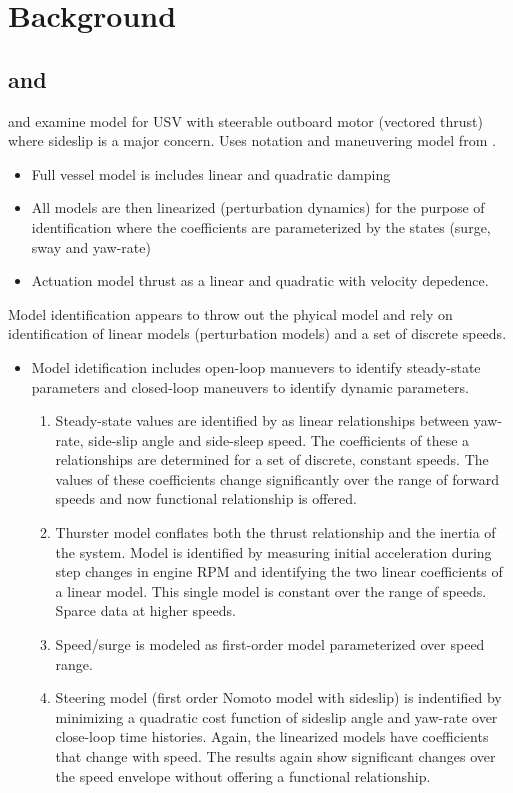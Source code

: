 \documentclass[11pt,draftcls,journal,onecolumn]{../latexlib/latex_ieee/IEEEtran}
\begin{document}
\section{Background}

\subsection{\cite{sonnenburg10control} and \cite{sonnenburg13modeling}}

\cite{sonnenburg13modeling} and \cite{sonnenburg10control} examine model for USV with steerable outboard motor (vectored thrust) where sideslip is a major concern.  Uses notation and maneuvering model from \cite{fossen94guidance}.
\begin{itemize}
\item Full vessel model is includes linear and quadratic damping
\item All models are then linearized (perturbation dynamics) for the purpose of identification where the coefficients are parameterized by the states (surge, sway and yaw-rate)
\item Actuation model thrust as a linear  and quadratic with velocity depedence.
\end{itemize}
Model identification appears to throw out the phyical model and rely on identification of linear models (perturbation models) and a set of discrete speeds.
\begin{itemize}
\item Model idetification includes open-loop manuevers to identify steady-state parameters and closed-loop maneuvers to identify dynamic parameters.
\begin{enumerate}
\item Steady-state values are identified by as linear relationships between yaw-rate, side-slip angle and side-sleep speed.  The coefficients of these a relationships are determined for a set of discrete, constant speeds.  The values of these coefficients change significantly over the range of forward speeds and now functional relationship is offered.  
\item Thurster model conflates both the thrust relationship and the inertia of the system.  Model is identified by measuring initial acceleration during step changes in engine RPM and identifying the two linear coefficients of a linear model.  This single model is constant over the range of speeds.  Sparce data at higher speeds.
\item Speed/surge is modeled as first-order model parameterized over speed range.
\item Steering model (first order Nomoto model with sideslip) is indentified by minimizing a quadratic cost function of sideslip angle and yaw-rate over close-loop time histories. Again, the linearized models have coefficients that change with speed.  The results again show significant changes over the speed envelope without offering a functional relationship.
\end{enumerate}
\end{itemize}
\end{document}
